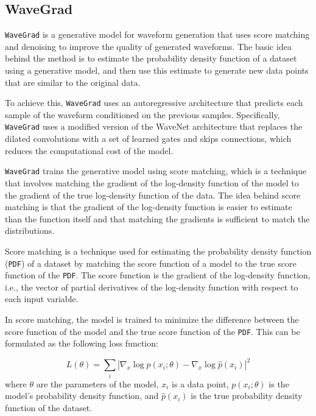 \documentclass[runningheads]{llncs}
\begin{document}

\subsection{WaveGrad}

\texttt{WaveGrad} is a generative model for waveform generation that uses score matching and denoising to improve the quality of generated waveforms. The basic idea behind the method is to estimate the probability density function of a dataset using a generative model, and then use this estimate to generate new data points that are similar to the original data.

To achieve this, \texttt{WaveGrad} uses an autoregressive architecture that predicts each sample of the waveform conditioned on the previous samples. Specifically, \texttt{WaveGrad} uses a modified version of the WaveNet architecture that replaces the dilated convolutions with a set of learned gates and skips connections, which reduces the computational cost of the model.

\texttt{WaveGrad} trains the generative model using score matching, which is a technique that involves matching the gradient of the log-density function of the model to the gradient of the true log-density function of the data. The idea behind score matching is that the gradient of the log-density function is easier to estimate than the function itself and that matching the gradients is sufficient to match the distributions.

Score matching is a technique used for estimating the probability density function (\texttt{PDF}) of a dataset by matching the score function of a model to the true score function of the \texttt{PDF}. The score function is the gradient of the log-density function, i.e., the vector of partial derivatives of the log-density function with respect to each input variable.

In score matching, the model is trained to minimize the difference between the score function of the model and the true score function of the \texttt{PDF}. This can be formulated as the following loss function:

\begin{equation}
L(\theta) = \sum_i |\nabla_x \log p(x_i; \theta) - \nabla_x \log \hat{p}(x_i)|^2
\end{equation}
where $\theta$ are the parameters of the model, $x_i$ is a data point, $p(x_i; \theta)$ is the model's probability density function, and $\hat{p}(x_i)$ is the true probability density function of the dataset.
\end{document}
